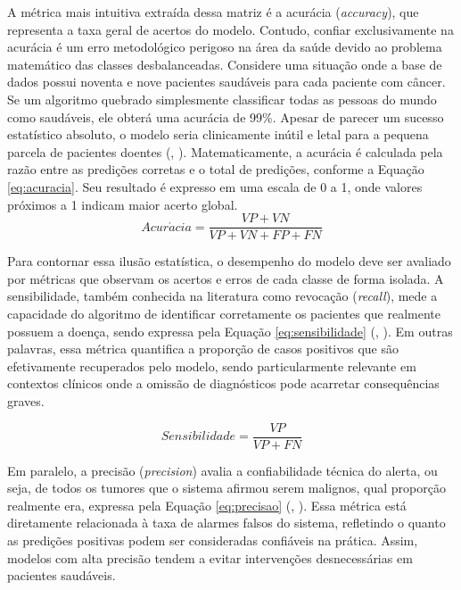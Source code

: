 \documentclass[
    12pt
    ,oneside
    ,a4paper
    ,chapter=TITLE
    ,section=TITLE
    ,sumario=abnt-6027-2012
    ,english,brazil]{abntex2} %
\begin{document}
A métrica mais intuitiva extraída dessa matriz é a acurácia (\textit{accuracy}), que representa a taxa geral de acertos do modelo. Contudo, confiar exclusivamente na acurácia é um erro metodológico perigoso na área da saúde devido ao problema matemático das classes desbalanceadas. Considere uma situação onde a base de dados possui noventa e nove pacientes saudáveis para cada paciente com câncer. Se um algoritmo quebrado simplesmente classificar todas as pessoas do mundo como saudáveis, ele obterá uma acurácia de 99\%. Apesar de parecer um sucesso estatístico absoluto, o modelo seria clinicamente inútil e letal para a pequena parcela de pacientes doentes (, \citeyear{Faceli2011}). Matematicamente, a acurácia é calculada pela razão entre as predições corretas e o total de predições, conforme a Equação \ref{eq:acuracia}. Seu resultado é expresso em uma escala de 0 a 1, onde valores próximos a 1 indicam maior acerto global.
\begin{equation}
    \label{eq:acuracia}
    Acur\acute{a}cia = \frac{VP + VN}{VP + VN + FP + FN}
\end{equation}



Para contornar essa ilusão estatística, o desempenho do modelo deve ser avaliado por métricas que observam os acertos e erros de cada classe de forma isolada. A sensibilidade, também conhecida na literatura como revocação (\textit{recall}), mede a capacidade do algoritmo de identificar corretamente os pacientes que realmente possuem a doença, sendo expressa pela Equação \ref{eq:sensibilidade} (, \citeyear{Davis2006}). Em outras palavras, essa métrica quantifica a proporção de casos positivos que são efetivamente recuperados pelo modelo, sendo particularmente relevante em contextos clínicos onde a omissão de diagnósticos pode acarretar consequências graves.

\begin{equation}
    \label{eq:sensibilidade}
    Sensibilidade = \frac{VP}{VP + FN}
\end{equation}



Em paralelo, a precisão (\textit{precision}) avalia a confiabilidade técnica do alerta, ou seja, de todos os tumores que o sistema afirmou serem malignos, qual proporção realmente era, expressa pela Equação \ref{eq:precisao} (, \citeyear{Davis2006}). Essa métrica está diretamente relacionada à taxa de alarmes falsos do sistema, refletindo o quanto as predições positivas podem ser consideradas confiáveis na prática. Assim, modelos com alta precisão tendem a evitar intervenções desnecessárias em pacientes saudáveis.
\end{document}
